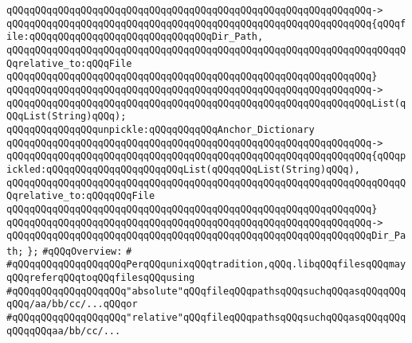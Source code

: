 \verb|qQQqqQQqqQQqqQQqqQQqqQQqqQQqqQQqqQQqqQQqqQQqqQQqqQQqqQQqqQQqqQQq->|\newline
\verb|qQQqqQQqqQQqqQQqqQQqqQQqqQQqqQQqqQQqqQQqqQQqqQQqqQQqqQQqqQQqqQQq{qQQqfile:qQQqqQQqqQQqqQQqqQQqqQQqqQQqqQQqDir_Path,|\newline
\verb|qQQqqQQqqQQqqQQqqQQqqQQqqQQqqQQqqQQqqQQqqQQqqQQqqQQqqQQqqQQqqQQqqQQqqQQqrelative_to:qQQqFile|\newline
\verb|qQQqqQQqqQQqqQQqqQQqqQQqqQQqqQQqqQQqqQQqqQQqqQQqqQQqqQQqqQQqqQQq}|\newline
\verb|qQQqqQQqqQQqqQQqqQQqqQQqqQQqqQQqqQQqqQQqqQQqqQQqqQQqqQQqqQQqqQQq->|\newline
\verb|qQQqqQQqqQQqqQQqqQQqqQQqqQQqqQQqqQQqqQQqqQQqqQQqqQQqqQQqqQQqqQQqList(qQQqList(String)qQQq);|\newline
\newline
\newline
\newline
\verb|qQQqqQQqqQQqqQQqunpickle:qQQqqQQqqQQqAnchor_Dictionary|\newline
\verb|qQQqqQQqqQQqqQQqqQQqqQQqqQQqqQQqqQQqqQQqqQQqqQQqqQQqqQQqqQQqqQQq->|\newline
\verb|qQQqqQQqqQQqqQQqqQQqqQQqqQQqqQQqqQQqqQQqqQQqqQQqqQQqqQQqqQQqqQQq{qQQqpickled:qQQqqQQqqQQqqQQqqQQqqQQqList(qQQqqQQqList(String)qQQq),|\newline
\verb|qQQqqQQqqQQqqQQqqQQqqQQqqQQqqQQqqQQqqQQqqQQqqQQqqQQqqQQqqQQqqQQqqQQqqQQqrelative_to:qQQqqQQqFile|\newline
\verb|qQQqqQQqqQQqqQQqqQQqqQQqqQQqqQQqqQQqqQQqqQQqqQQqqQQqqQQqqQQqqQQq}|\newline
\verb|qQQqqQQqqQQqqQQqqQQqqQQqqQQqqQQqqQQqqQQqqQQqqQQqqQQqqQQqqQQqqQQq->|\newline
\verb|qQQqqQQqqQQqqQQqqQQqqQQqqQQqqQQqqQQqqQQqqQQqqQQqqQQqqQQqqQQqqQQqDir_Path;|\newline
\newline
\verb|};|\newline
\newline
\verb|#qQQqOverview:|\newline
\verb|#|\newline
\verb|#qQQqqQQqqQQqqQQqqQQqPerqQQqunixqQQqtradition,qQQq.libqQQqfilesqQQqmayqQQqreferqQQqtoqQQqfilesqQQqusing|\newline
\verb|#qQQqqQQqqQQqqQQqqQQq"absolute"qQQqfileqQQqpathsqQQqsuchqQQqasqQQqqQQqqQQq/aa/bb/cc/...qQQqor|\newline
\verb|#qQQqqQQqqQQqqQQqqQQq"relative"qQQqfileqQQqpathsqQQqsuchqQQqasqQQqqQQqqQQqqQQqaa/bb/cc/...|\newline
